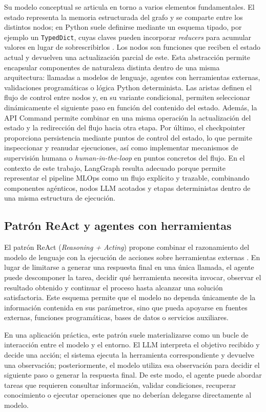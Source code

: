 \documentclass[12pt,a4paper]{article}
\theoremstyle{plain}
\begin{document}
Su modelo conceptual se articula en torno a varios elementos fundamentales. El estado representa la memoria estructurada del grafo y se comparte entre los distintos nodos; en Python suele definirse mediante un esquema tipado, por ejemplo un \texttt{TypedDict}, cuyas claves pueden incorporar \textit{reducers} para acumular valores en lugar de sobrescribirlos \cite{typedict}. Los nodos son funciones que reciben el estado actual y devuelven una actualización parcial de este. Esta abstracción permite encapsular componentes de naturaleza distinta dentro de una misma arquitectura: llamadas a modelos de lenguaje, agentes con herramientas externas, validaciones programáticas o lógica Python determinista. Las aristas definen el flujo de control entre nodos y, en su variante condicional, permiten seleccionar dinámicamente el siguiente paso en función del contenido del estado. Además, la API Command permite combinar en una misma operación la actualización del estado y la redirección del flujo hacia otra etapa. Por último, el checkpointer proporciona persistencia mediante puntos de control del estado, lo que permite inspeccionar y reanudar ejecuciones, así como implementar mecanismos de supervisión humana o \textit{human-in-the-loop} en puntos concretos del flujo. En el contexto de este trabajo, LangGraph resulta adecuado porque permite representar el pipeline MLOps como un flujo explícito y trazable, combinando componentes agénticos, nodos LLM acotados y etapas deterministas dentro de una misma estructura de ejecución.

\subsection{Patrón ReAct y agentes con herramientas}
\label{sec:react}

El patrón ReAct (\emph{Reasoning + Acting}) propone combinar el razonamiento del modelo de lenguaje con la ejecución de acciones sobre herramientas externas \cite{yao_react}. En lugar de limitarse a generar una respuesta final en una única llamada, el agente puede descomponer la tarea, decidir qué herramienta necesita invocar, observar el resultado obtenido y continuar el proceso hasta alcanzar una solución satisfactoria. Este esquema permite que el modelo no dependa únicamente de la información contenida en sus parámetros, sino que pueda apoyarse en fuentes externas, funciones programáticas, bases de datos o servicios auxiliares.

En una aplicación práctica, este patrón suele materializarse como un bucle de interacción entre el modelo y el entorno. El LLM interpreta el objetivo recibido y decide una acción; el sistema ejecuta la herramienta correspondiente y devuelve una observación; posteriormente, el modelo utiliza esa observación para decidir el siguiente paso o generar la respuesta final. De este modo, el agente puede abordar tareas que requieren consultar información, validar condiciones, recuperar conocimiento o ejecutar operaciones que no deberían delegarse directamente al modelo.
\end{document}
